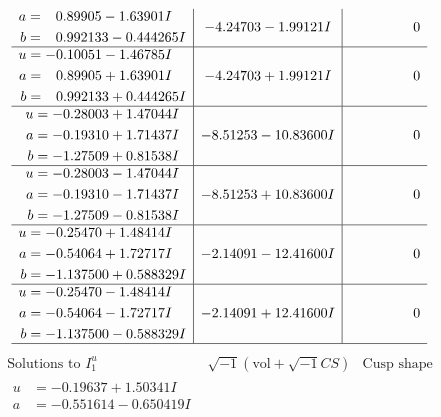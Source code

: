 \documentclass[1p]{elsarticle_modified}
\theoremstyle{definition}
\newcommand{\I}{\sqrt{-1}}
\begin{document}
$$\begin{array}{c|c|c}
\begin{aligned}
a &= \phantom{-}0.89905 - 1.63901 I \\
b &= \phantom{-}0.992133 - 0.444265 I\end{aligned}
 & -4.24703 - 1.99121 I & \phantom{-0.000000 } 0 \\ \hline\begin{aligned}
u &= -0.10051 - 1.46785 I \\
a &= \phantom{-}0.89905 + 1.63901 I \\
b &= \phantom{-}0.992133 + 0.444265 I\end{aligned}
 & -4.24703 + 1.99121 I & \phantom{-0.000000 } 0 \\ \hline\begin{aligned}
u &= -0.28003 + 1.47044 I \\
a &= -0.19310 + 1.71437 I \\
b &= -1.27509 + 0.81538 I\end{aligned}
 & -8.51253 - 10.83600 I & \phantom{-0.000000 } 0 \\ \hline\begin{aligned}
u &= -0.28003 - 1.47044 I \\
a &= -0.19310 - 1.71437 I \\
b &= -1.27509 - 0.81538 I\end{aligned}
 & -8.51253 + 10.83600 I & \phantom{-0.000000 } 0 \\ \hline\begin{aligned}
u &= -0.25470 + 1.48414 I \\
a &= -0.54064 + 1.72717 I \\
b &= -1.137500 + 0.588329 I\end{aligned}
 & -2.14091 - 12.41600 I & \phantom{-0.000000 } 0 \\ \hline\begin{aligned}
u &= -0.25470 - 1.48414 I \\
a &= -0.54064 - 1.72717 I \\
b &= -1.137500 - 0.588329 I\end{aligned}
 & -2.14091 + 12.41600 I & \phantom{-0.000000 } 0\\
 \hline 
 \end{array}$$\newpage$$\begin{array}{c|c|c}  
\text{Solutions to }I^u_{1}& \I (\text{vol} + \sqrt{-1}CS) & \text{Cusp shape}\\
 \hline 
\begin{aligned}
u &= -0.19637 + 1.50341 I \\
a &= -0.551614 - 0.650419 I \\

\end{aligned}
\end{array}$$
\end{document}

